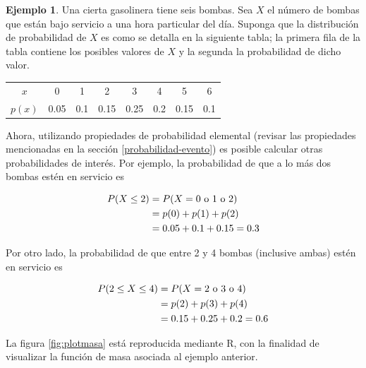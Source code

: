 \documentclass[
  11pt,
]{book}
\theoremstyle{definition}
\theoremstyle{definition}
\newtheorem{example}{Ejemplo}[chapter]
\theoremstyle{definition}
\theoremstyle{definition}
\theoremstyle{remark}
\begin{document}
\begin{example}

Una cierta gasolinera tiene seis bombas. Sea \(X\) el número de bombas que están bajo servicio a una hora particular del día. Suponga que la distribución de probabilidad de \(X\) es como se detalla en la siguiente tabla; la primera fila de la tabla contiene los posibles valores de \(X\) y la segunda la probabilidad de dicho valor.

\begin{table}[H]
\centering
\begin{tabular}[t]{cccccccc}
\toprule
$x$ & 0 & 1 & 2 & 3 & 4 & 5 & 6\\
$p(x)$ & 0.05 & 0.1 & 0.15 & 0.25 & 0.2 & 0.15 & 0.1\\
\bottomrule
\end{tabular}
\end{table}

Ahora, utilizando propiedades de probabilidad elemental (revisar las propiedades mencionadas en la sección \ref{probabilidad-evento}) es posible calcular otras probabilidades de interés. Por ejemplo, la probabilidad de que a lo más dos bombas estén en servicio es

\begin{equation}
  \notag
  \begin{split}
    P(X\leq 2) &= P(X = 0 \text{ o } 1 \text{ o } 2) \\
    & = p(0) + p(1) + p(2) \\
    & = 0.05 + 0.1 + 0.15 = 0.3
  \end{split}
\end{equation}

Por otro lado, la probabilidad de que entre 2 y 4 bombas (inclusive ambas) estén en servicio es

\begin{equation}
  \notag
  \begin{split}
    P(2\leq X\leq 4) &= P(X = 2 \text{ o } 3 \text{ o } 4)\\
    & = p(2) + p(3) + p(4) \\
    & = 0.15 + 0.25 + 0.2 = 0.6
  \end{split}
\end{equation}

\end{example}

La figura \ref{fig:plotmasa} está reproducida mediante R, con la finalidad de visualizar la función de masa asociada al ejemplo anterior.
\end{document}
